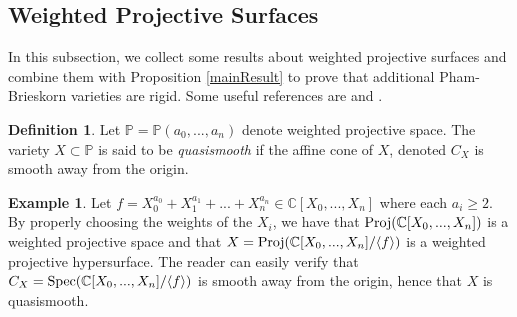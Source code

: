 \documentclass[12pt]{amsart}
\theoremstyle{plain}
\theoremstyle{definition}
\newtheorem{definition}[subsection]{Definition}
\newtheorem{example}[subsection]{Example}
\newcommand{\Spec}{		\operatorname{{\rm Spec}}}
\newcommand{\Proj}{		\operatorname{{\rm Proj}}}
\newcommand{\lb}{\langle}
\newcommand{\rb}{\rangle}
\newcommand{\Comp}{\ensuremath{\mathbb{C}}}
\newcommand{\proj}{\ensuremath{\mathbb{P}}}
\begin{document}
\subsection{Weighted Projective Surfaces} 
		
In this subsection, we collect some results about weighted projective surfaces and combine them with Proposition \ref{mainResult} to prove that additional Pham-Brieskorn varieties are rigid. Some useful references are \cite{iano-fletcher_2000} and \cite{dolgachev}.	

\begin{definition}
	Let $\proj = \proj(a_0, ..., a_n)$ denote weighted projective space. The variety $X \subset \proj$ is said to be \textit{quasismooth} if the affine cone of $X$, denoted $C_X$ is smooth away from the origin. 
\end{definition}

\begin{example}
	Let $f = X_0^{a_0} + X_1^{a_1} + ... + X_n^{a_n} \in \Comp[X_0, ..., X_n]$ where each $a_i \geq 2$. By properly choosing the weights of the $X_i$, we have that $\Proj(\Comp[X_0, ..., X_n])$ is a weighted projective space and that $X = \Proj(\Comp[X_0, ..., X_n] / \lb f \rb)$ is a weighted projective hypersurface. The reader can easily verify that $C_X = \Spec(\Comp[X_0, ..., X_n] / \lb f \rb)$ is smooth away from the origin, hence that $X$ is quasismooth. 
\end{example}
        








\end{document}
